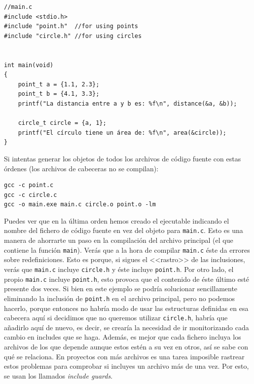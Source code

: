 \documentclass[a4paper]{article}
\begin{document}
\noindent
\begin{minipage}[H]{\linewidth}
\mbox{}
\begin{lstlisting}[style=C,
caption={Ejemplo de redefinición -- \texttt{main.c}},
label={lst:redefInclude}]
//main.c
#include <stdio.h>
#include "point.h"  //for using points
#include "circle.h" //for using circles


int main(void)
{
    point_t a = {1.1, 2.3};
    point_t b = {4.1, 3.3};
    printf("La distancia entre a y b es: %f\n", distance(&a, &b));

    circle_t circle = {a, 1};
    printf("El círculo tiene un área de: %f\n", area(&circle));
}
\end{lstlisting}
\end{minipage}

Si intentas generar los objetos de todos los archivos de código fuente con estas órdenes (los
archivos de cabeceras no se compilan):

\noindent
\begin{minipage}[H]{\linewidth}
\mbox{}
\begin{lstlisting}[style=terminalStyle]
gcc -c point.c
gcc -c circle.c
gcc -o main.exe main.c circle.o point.o -lm
\end{lstlisting}
\end{minipage}

Puedes ver que en la última orden hemos creado el ejecutable indicando el nombre
del fichero de código fuente en vez del objeto para \verb!main.c!. Esto es una
manera de ahorrarte un paso en la compilación del archivo principal (el que
contiene la función \verb!main!).
Verás que a la hora de compilar
\verb!main.c! éste da errores sobre redefiniciones. Esto es porque, si sigues
el <<rastro>> de las inclusiones, verás que \verb!main.c! incluye
\verb!circle.h! y éste incluye \verb!point.h!. Por otro lado, el propio
\verb!main.c! incluye \verb!point.h!, esto provoca que el contenido de éste
último esté presente dos veces. Si bien en este ejemplo se podría solucionar
sencillamente eliminando la inclusión de \verb!point.h! en el archivo principal,
pero no podemos hacerlo, porque entonces no habría modo de usar las estructuras
definidas en esa cabecera aquí si decidimos que no queremos utilizar
\texttt{circle.h}, habría que añadirlo aquí de nuevo, es decir, se crearía la
necesidad de ir monitorizando cada cambio en includes que se haga. Además, es
mejor que cada fichero incluya los archivos de los que depende aunque estos
estén a su vez en otros, así se sabe con qué se relaciona.
En proyectos con más archivos es una tarea imposible rastrear estos problemas
para comprobar si incluyes un archivo más de una vez.
Por esto, se usan los llamados \emph{include guards}.
\end{document}
